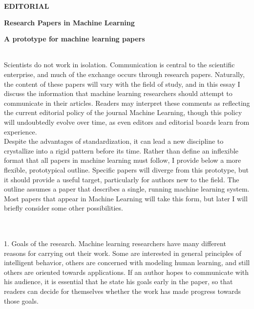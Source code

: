 \documentclass{article}
\begin{document}

\begin{flashleft}

\textbf{EDITORIAL}

\end{flashleft}

\textbf{Research Papers in Machine Learning}\\

\begin{small}
\textbf{A prototype for machine learning papers}
\end{small}\\

Scientists do not work in isolation. Communication is central to the
scientific enterprise, and much of the exchange occurs through research
papers. Naturally, the content of these papers will vary with the field of
study, and in this essay I discuss the information that machine learning
researchers should attempt to communicate in their articles. Readers may
interpret these comments as reflecting the current editorial policy of the
journal Machine Learning, though this policy will undoubtedly evolve over
time, as even editors and editorial boards learn from experience.\\

Despite the advantages of standardization, it can lead a new discipline
to crystallize into a rigid pattern before its time. Rather than define an
inflexible format that all papers in machine learning must follow, I provide
below a more flexible, prototypical outline. Specific papers will diverge
from this prototype, but it should provide a useful target, particularly
for authors new to the field. The outline assumes a paper that describes
a single, running machine learning system. Most papers that appear in
Machine Learning will take this form, but later I will briefly consider some
other possibilities.
\\\\\

1. Goals of the research. Machine learning researchers have many different
reasons for carrying out their work. Some are interested in general
principles of intelligent behavior, others are concerned with modeling
human learning, and still others are oriented towards applications. If
an author hopes to communicate with his audience, it is essential that
he state his goals early in the paper, so that readers can decide for
themselves whether the work has made progress towards those goals.\\\\
\end{document}
